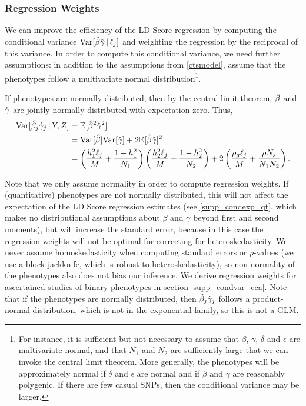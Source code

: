 \documentclass[11pt]{article}
\numberwithin{equation}{section}
\numberwithin{definition}{section}
\numberwithin{thm}{section}
\numberwithin{lemma}{section}
\numberwithin{prop}{section}
\numberwithin{cor}{section}
\numberwithin{hyp}{section}
\begin{document}
\subsubsection{Regression Weights}

We can improve the efficiency of the LD Score regression by computing the conditional variance 
$\mathrm{Var}[\hat{\beta}\hat{\gamma} \,|\,\ell_j]$
and weighting the regression by the reciprocal of this variance. 
In order to compute this conditional variance, 
we need further assumptions: in addition to the assumptions from \ref{ctsmodel}, 
assume that the phenotypes follow a multivariate normal distribution\footnote{
For instance, it is sufficient but not necessary to assume that $\beta$, $\gamma$, $\delta$ and $\epsilon$ are multivariate normal, 
and that $N_1$ and $N_2$ are sufficiently large that we can invoke the central limit theorem. 
More generally, the phenotypes will be approximately normal if $\delta$ and $\epsilon$ are normal 
and if $\beta$ and $\gamma$ are reasonably polygenic.
If there are few casual SNPs, then the conditional variance may be larger.}.

If phenotypes are normally distributed, then by the central limit theorem,
$\hat{\beta}$ and $\hat{\gamma}$ are jointly normally distributed with expectation zero. 
Thus,
\begin{align}
    \mathrm{Var}[\hat{\beta}_j\hat{\gamma}_j\,|\,Y,Z] 
&= 
	\mathbb{E}[\hat{\beta}^2\hat{\gamma}^2]\nonumber\\
&=  
	\mathrm{Var}[\hat{\beta}]\mathrm{Var}[\hat{\gamma}]
	+
	2\mathbb{E}[\hat{\beta}\hat{\gamma}]^2\nonumber\\
&= 
	\left( 
		\frac{h_{1}^2\ell_j}{M} 
		+ 
		\frac{1-h_{1}^2}{N_1} 
	\right) \left(  
		\frac{h_{2}^2\ell_j}{M} 
		+ 
		\frac{1-h_{2}^2}{N_2}
	\right) 
	+ 					
	2\left( 
		\frac{\rho_g\ell_j}{M} 
		+ 
		\frac{\rho N_s}{N_1N_2} 
	\right).
\end{align}

Note that we only assume normality in order to compute regression weights.
If (quantitative) phenotypes are not normally distributed,
this will not affect the expectation of the LD Score regression estimates
(see \ref{supp_condexp_qt}, which makes no distributional assumptions about $\beta$ and $\gamma$ beyond first and second moments),
but will increase the standard error,
because in this case the regression weights will not be optimal for correcting for heteroskedasticity.
We never assume homoskedasticity when computing standard errors or $p$-values 
(we use a block jackknife, which is robust to heteroskedasticity), 
so non-normality of the phenotypes also does not bias our inference.
We derive regression weights for ascertained studies of binary phenotypes in section \ref{supp_condvar_cca}.
Note that if the phenotypes are normally distributed, then $\hat{\beta}_j\hat{\gamma}_j$
follows a product-normal distribution, which is not in the exponential family, so this is not a GLM.
\end{document}
